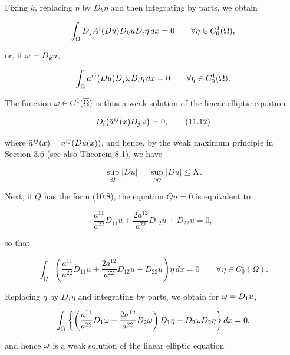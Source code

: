Fixing $k$, replacing $\eta$ by $D_k\eta$ and then integrating by parts, we obtain

\begin{equation}
\int_{\Omega} D_j A^i(Du) D_k u D_i\eta \, dx = 0 \qquad \forall \eta \in C_0^1(\Omega),
\end{equation}

or, if $\omega = D_k u$,

\begin{equation}
\int_{\Omega} a^{ij}(Du) D_j \omega D_i\eta \, dx = 0 \qquad \forall \eta \in C_0^1(\Omega).
\end{equation}

The function $\omega \in C^1(\overline{\Omega})$ is thus a weak solution of the linear elliptic equation

\begin{equation}
D_i\bigl(\bar a^{ij}(x)D_j \omega\bigr)=0,
\tag{11.12}
\end{equation}

where $\bar a^{ij}(x)=a^{ij}(Du(x))$, and hence, by the weak maximum principle in Section 3.6
(see also Theorem 8.1), we have

\begin{equation}
\sup_{\Omega} |Du| = \sup_{\partial\Omega} |Du| \le K.
\tag{11.13}
\end{equation}

Next, if $Q$ has the form (10.8), the equation $Qu=0$ is equivalent to

\begin{equation}
\frac{a^{11}}{a^{22}}D_{11}u + \frac{2a^{12}}{a^{22}}D_{12}u + D_{22}u = 0,
\end{equation}

so that

\begin{equation}
\int_{\Omega}\left(\frac{a^{11}}{a^{22}}D_{11}u + \frac{2a^{12}}{a^{22}}D_{12}u + D_{22}u\right)\eta \, dx = 0 \qquad \forall \eta \in C_0^1(\Omega).
\end{equation}

Replacing $\eta$ by $D_1\eta$ and integrating by parts, we obtain for $\omega = D_1u$,

\begin{equation}
\int_{\Omega}\left\{\left(\frac{a^{11}}{a^{22}}D_1\omega + \frac{2a^{12}}{a^{22}}D_2\omega\right)D_1\eta + D_2\omega D_2\eta\right\} dx = 0,
\end{equation}

and hence $\omega$ is a weak solution of the linear elliptic equation

